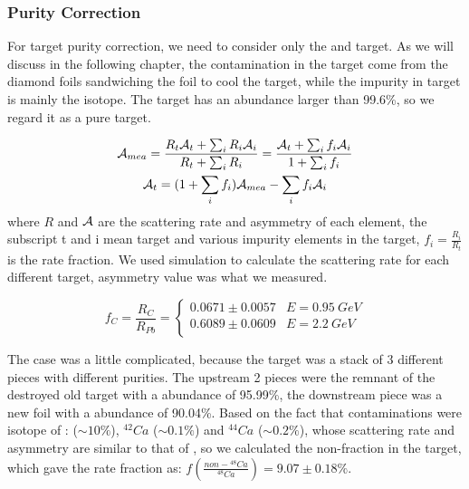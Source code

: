 \subsubsection{Purity Correction}
For target purity correction, we need to consider only the \Pb and \Ca target.
As we will discuss in the following chapter, the contamination in the \Pb target
come from the diamond foils sandwiching the \Pb foil to cool the target, while
the impurity in \Ca target is mainly the \ca isotope. The \ca target has an abundance
larger than 99.6\%, so we regard it as a pure target.

\begin{equation}
    \begin{gathered}
	\mathcal{A}_{mea} = \frac{R_t\mathcal{A}_t + \sum_i R_i \mathcal{A}_i}{R_t + \sum_i R_i} = \frac{\mathcal{A}_t + \sum_i f_i \mathcal{A}_i}{1 + \sum_i f_i}  \\
	\mathcal{A}_t = (1 + \sum_i f_i)\mathcal{A}_{mea} - \sum_i f_i\mathcal{A}_i
    \end{gathered}
    \label{eq:AT-asymmetry_correction}
\end{equation}
where $R$ and $\mathcal{A}$ are the scattering rate and asymmetry of each element, the
subscript t and i mean target and various impurity elements in the target, 
$f_i = \frac{R_i}{R_t}$ is the rate fraction. 
We used simulation to calculate the scattering rate for each different
target, asymmetry value was what we measured.

\begin{equation}
    f_C = \frac{R_C}{R_{Pb}} = 
    \begin{cases}
	0.0671 \pm 0.0057   & E = 0.95\ GeV	\\
	0.6089 \pm 0.0609   & E = 2.2\ GeV	\\
    \end{cases}
\end{equation}

The \Ca case was a little complicated, because the \Ca target was a stack of 3 different
pieces with different purities. The upstream 2 pieces were the remnant of the destroyed
old target with a \Ca abundance of 95.99\%, the downstream piece was a new foil
with a \Ca abundance of 90.04\%. Based on the fact that contaminations were isotope
of \Ca: \ca ($\sim10\%$), ${}^{42}Ca$ ($\sim0.1\%$) and ${}^{44}Ca$ ($\sim0.2\%$), whose 
scattering rate and asymmetry are similar to that of \Ca, so we calculated the
non-\Ca fraction in the \Ca target, which gave the rate fraction as: 
$f(\frac{non-{}^{48}Ca}{{}^{48}Ca}) = 9.07 \pm 0.18 \%$.

